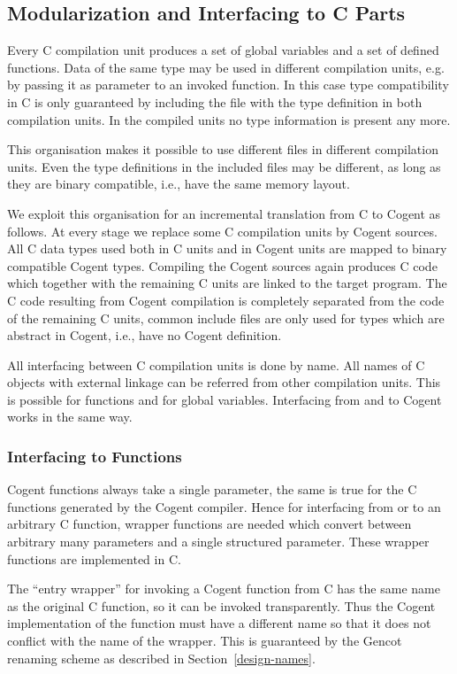 \subsection{Modularization and Interfacing to C Parts}
\label{design-modular}

Every C compilation unit produces
a set of global variables and a set of defined functions. Data of the same type may be used in
different compilation units, e.g. by passing it as parameter to an invoked function. In this case type compatibility in C is
only guaranteed by including the  file with the type definition in both compilation units. In the compiled
units no type information is present any more. 

This organisation makes it possible to use different  files in different compilation units. Even the type definitions
in the included files may be different, as long as they are binary compatible, i.e., have the same memory layout.

We exploit this organisation for an incremental translation from C to Cogent as follows. At every stage we replace some 
C compilation units by Cogent sources. All C data types used both in C units and in Cogent units are mapped to binary compatible
Cogent types. Compiling the Cogent sources again produces C code which together with the remaining C units are linked to
the target program. The C code resulting from Cogent compilation is completely separated from the code of the remaining C units,
common include files are only used for types which are abstract in Cogent, i.e., have no Cogent definition.

All interfacing between C compilation units is done by name. All names of C objects with external linkage can be referred
from other compilation units. This is possible for functions and for global variables. Interfacing from and to Cogent works
in the same way. 

\subsubsection{Interfacing to Functions}

Cogent functions always take a single parameter, the same is true for the C functions generated by the Cogent compiler. Hence
for interfacing from or to an arbitrary C function, wrapper functions are needed which convert between arbitrary many parameters
and a single structured parameter. These wrapper functions are implemented in C. 

The ``entry wrapper'' for invoking a Cogent function 
from C has the same name as the original C function, so it can be invoked transparently. Thus the Cogent implementation of
the function must have a different name so that it does not conflict with the name of the wrapper. This is guaranteed by the 
Gencot renaming scheme as described in Section~\ref{design-names}.

